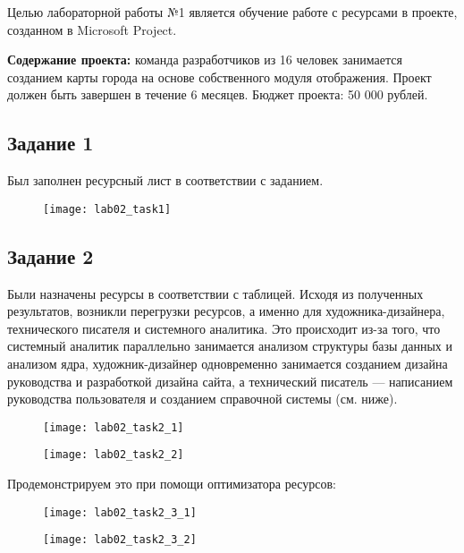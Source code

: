Целью лабораторной работы №1 является обучение работе с ресурсами в проекте, созданном в Microsoft Project.

\textbf{Содержание проекта:} команда разработчиков из 16 человек занимается созданием карты города на основе собственного модуля отображения. Проект должен быть завершен в течение 6 месяцев. Бюджет проекта: 50 000 рублей.


\subsection*{Задание 1}

Был заполнен ресурсный лист в соответствии с заданием.

\begin{figure}[h!]
	\texttt{[image: lab02\_task1]}
\end{figure}

\subsection*{Задание 2}

Были назначены ресурсы в соответствии с таблицей.
Исходя из полученных результатов, возникли перегрузки ресурсов, а именно для художника-дизайнера, технического  писателя и системного аналитика. Это происходит из-за того, что системный аналитик параллельно занимается анализом структуры базы данных и анализом ядра, художник-дизайнер одновременно занимается созданием дизайна руководства и разработкой дизайна сайта, а технический писатель --- написанием руководства пользователя и созданием справочной системы (см. ниже).

\begin{figure}[h!]
	\texttt{[image: lab02\_task2\_1]}
\end{figure}

\begin{figure}[h!]
	\texttt{[image: lab02\_task2\_2]}
\end{figure}
\clearpage

Продемонстрируем это при помощи оптимизатора ресурсов:

\begin{figure}[h!]
	\texttt{[image: lab02\_task2\_3\_1]}
\end{figure}

\begin{figure}[h!]
	\texttt{[image: lab02\_task2\_3\_2]}
\end{figure}


